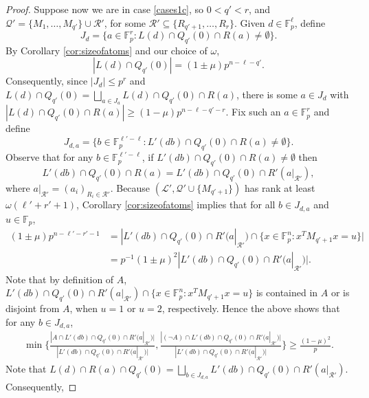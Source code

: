 \documentclass[12pt,oneside,british,a4wide]{amsart}
\numberwithin{equation}{section}
\theoremstyle{definition}
\def\F{\mathbb{F}}
\newcommand{\calL}{\mathcal{L}}
\newcommand{\calQ}{\mathcal{Q}}
\newcommand{\calR}{\mathcal{R}}
\begin{document}
\begin{proof}
Suppose now we are in case \ref{cases1c}, so $0<q' <r$, and $\calQ'=\{M_1,\ldots, M_{q'}\}\cup \calR'$, for some $\calR'\subseteq \{R_{q'+1},\ldots, R_r\}$. Given $d\in \F_p^\ell$, define
$$
J_{d}=\{a\in \mathbb{F}_p^r: L(d)\cap Q_{q'}(0)\cap R(a)\neq \emptyset\}.
$$
By Corollary \ref{cor:sizeofatoms} and our choice of $\omega$,
$$
|L(d)\cap Q_{q'}(0)|=(1\pm \mu)p^{n-\ell-q'}.
$$
Consequently, since $|J_{d}|\leq p^r$ and $L(d)\cap Q_{q'}(0)=\bigsqcup_{a\in J_{a}}L(d)\cap Q_{q'}(0)\cap R(a)$, there is some $a\in J_{d}$ with $|L(d)\cap Q_{q'}(0)\cap R(a)|\geq (1-\mu)p^{n-\ell-q'-r}$.   Fix such an $a\in \F_p^r$ and define 
\[J_{d,a}=\{b\in \mathbb{F}_p^{\ell'-\ell}: L'(db)\cap Q_{q'}(0)\cap R(a)\neq \emptyset\}.\]
Observe that for any $b\in \F_p^{\ell'-\ell}$, if $L'(db)\cap Q_{q'}(0)\cap R(a)\neq \emptyset$ then 
$$
L'(db)\cap Q_{q'}(0)\cap R(a)=L'(db)\cap Q_{q'}(0)\cap R'(a|_{\calR'}),
$$
where $a|_{\calR'}=(a_i)_{R_i\in \calR'}$.  Because $(\calL',\calQ'\cup \{M_{q'+1}\})$ has rank at least $\omega(\ell'+r'+1)$, Corollary \ref{cor:sizeofatoms} implies that for all $b\in J_{d,a}$ and $u\in \F_p$,
\begin{align*}
(1\pm \mu) p^{n-\ell'-r'-1}&= |L'(db)\cap Q_{q'}(0)\cap R'(a|_{\calR'})\cap \{x\in \mathbb{F}_p^n: x^TM_{q'+1}x=u\}|\\
&=p^{-1}(1\pm \mu)^2 |L'(db)\cap Q_{q'}(0)\cap R'(a|_{\calR'})|.
\end{align*}
Note that by definition of $A$, $L'(db)\cap Q_{q'}(0)\cap R'(a|_{\calR'})\cap \{x\in \mathbb{F}_p^n: x^TM_{q'+1}x=u\}$ is contained in $A$ or is disjoint from $A$, when $u=1$ or $u=2$, respectively. Hence the above shows that for any $b\in J_{d,a}$,
\begin{align*}
\min\Big\{\frac{|A\cap L'(db)\cap Q_{q'}(0)\cap R'(a|_{\calR'})|}{|L'(db)\cap Q_{q'}(0)\cap R'(a|_{\calR'})|}, \frac{|(\neg A)\cap L'(db)\cap Q_{q'}(0)\cap R'(a|_{\calR'})|}{|L'(db)\cap Q_{q'}(0)\cap R'(a|_{\calR'})|}\Big\}\geq \frac{(1-\mu)^2}{p}.
\end{align*}
Note that $L(d)\cap R(a)\cap Q_{q'}(0)=\bigsqcup_{b\in J_{d,a}}L'(db)\cap Q_{q'}(0)\cap R'(a|_{\calR'})$.    Consequently, 
 

\end{proof}
\end{document}
